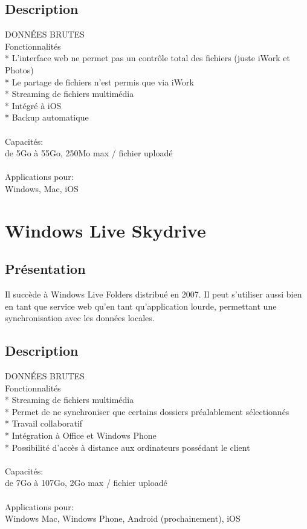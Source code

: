 \subsection{Description}
DONNÉES BRUTES\\
Fonctionnalités\\
* L'interface web ne permet pas un contrôle total des fichiers (juste iWork et Photos)\\
* Le partage de fichiers n'est permis que via iWork\\
* Streaming de fichiers multimédia\\
* Intégré à iOS\\
* Backup automatique\\
\\
Capacités:\\
de 5Go à 55Go, 250Mo max / fichier uploadé\\
\\
Applications pour:\\
Windows, Mac, iOS\\


\section{Windows Live Skydrive}

\subsection{Présentation}
Il succède à Windows Live Folders distribué en 2007. Il peut s'utiliser aussi bien en tant que service web qu'en tant qu'application lourde, permettant une synchronisation avec les données locales.\\

\subsection{Description}
DONNÉES BRUTES\\
Fonctionnalités\\
* Streaming de fichiers multimédia\\
* Permet de ne synchroniser que certains dossiers préalablement sélectionnés\\
* Travail collaboratif\\
* Intégration à Office et Windows Phone\\
* Possibilité d'accès à distance aux ordinateurs possédant le client\\
\\
Capacités:\\
de 7Go à 107Go, 2Go max / fichier uploadé\\
\\
Applications pour:\\
Windows Mac, Windows Phone, Android (prochainement), iOS\\